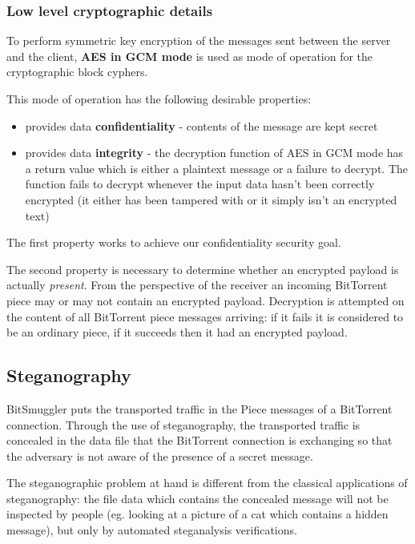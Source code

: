 \documentclass[11pt]{article} %
\newcommand{\projectName}{BitSmuggler }
\begin{document}
\subsubsection{Low level cryptographic details}

To perform symmetric key encryption of the messages sent between the server and the client, \textbf{AES in GCM mode} is used as mode of operation for the cryptographic block cyphers.

This mode of operation has the following desirable properties:
\begin{itemize}
\item provides data \textbf{confidentiality} - contents of the message are kept secret
\item provides data \textbf{integrity} - the decryption function of AES in GCM mode has a return value which is either a plaintext message or a failure to decrypt. The function fails to decrypt whenever the input data hasn't been correctly encrypted (it either has been tampered with or it simply isn't an encrypted text)
\end{itemize}

The first property works to achieve our confidentiality security goal.

The second property is necessary to determine whether an encrypted payload is actually \textit{present}.  From the perspective of the receiver an incoming BitTorrent piece may or may not contain an encrypted payload. Decryption is attempted on the content of all BitTorrent piece messages arriving: if it fails it is considered to be an ordinary piece, if it succeeds then it had an encrypted payload.



\subsection{Steganography}
\label{subsec:steg}

\projectName puts the transported traffic in the Piece messages of a BitTorrent connection. Through the use of steganography, the transported traffic is concealed in the data file that the BitTorrent connection is exchanging so that the adversary is not aware of the presence of a secret message.

The steganographic problem at hand is different from the classical applications of steganography: the file data which contains the concealed message will not be inspected by people (eg. looking at a picture of a cat which contains a hidden message), but only by automated steganalysis verifications.
\end{document}
